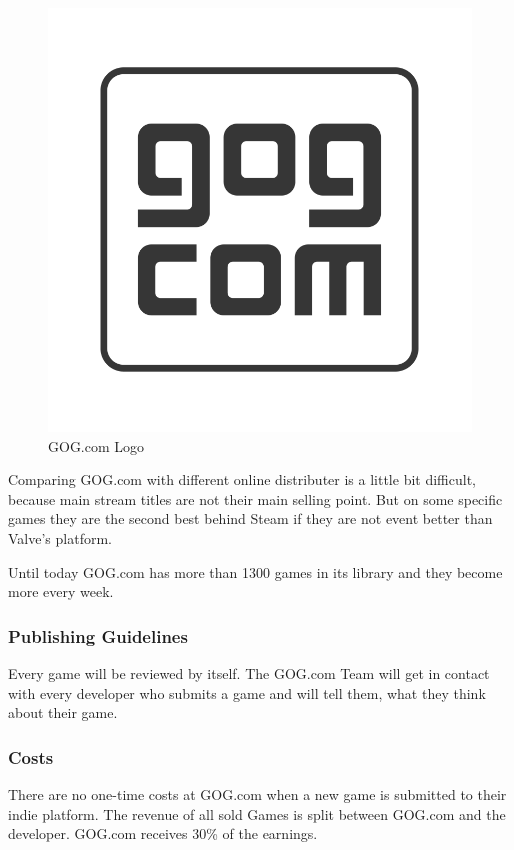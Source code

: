 \begin{figure}[!hbp]
\includegraphics[width=\linewidth]{img/gogcom.png}
\centering
\caption{ GOG.com Logo }
\label{fig:gog}
\end{figure}

Comparing GOG.com with different online distributer is a little bit difficult, because main stream titles are not their main selling point. But on some specific games they are the second best behind Steam if they are not event better than Valve's platform.

Until today GOG.com has more than 1300 games in its library and they become more every week.

\subsubsection{Publishing Guidelines}
\label{gog_publishing_guidlines}
Every game will be reviewed by itself. The GOG.com Team will get in contact with every developer who submits a game and will tell them, what they think about their game.

\subsubsection{Costs}
\label{subsec:gog_costs}
There are no one-time costs at GOG.com when a new game is submitted to their indie platform. The revenue of all sold Games is split between GOG.com and the developer. GOG.com receives 30\% of the earnings.

